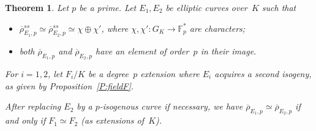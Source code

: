 \documentclass[12pt, reqno]{amsart}
\newcommand{\Fpstar}{\mathbb{F}_p^*}
\newcommand{\rhobar}{{\overline{\rho}}}
\numberwithin{equation}{section}
\newtheorem{theorem}{Theorem}[section]
\theoremstyle{definition}
\theoremstyle{remark}
\begin{document}
\begin{theorem} \label{T:reducible}
Let $p$ be a prime. Let $E_1, E_2$ be elliptic curves over~$K$ such
that
\begin{itemize}
 \item[(i)] $\rhobar_{E_1,p}^{ss} \simeq \rhobar_{E_2,p}^{ss} \simeq \chi \oplus \chi'$,  where $\chi, \chi' : G_K \to \Fpstar$ are characters;
 \item[(ii)] both $\rhobar_{E_1,p}$ and $\rhobar_{E_2,p}$ have an element of
 order~$p$ in their image.
\end{itemize}
For $i=1,2$, let $F_i/K$ be a degree~$p$ extension where $E_i$
acquires a second isogeny, as given by Proposition~\ref{P:fieldF}.

After replacing $E_2$ by a $p$-isogenous curve if necessary, we have
$\rhobar_{E_1,p} \simeq \rhobar_{E_2,p}$ if and only if $F_1 \simeq
F_2$ (as extensions of~$K$).
\end{theorem}
\end{document}
